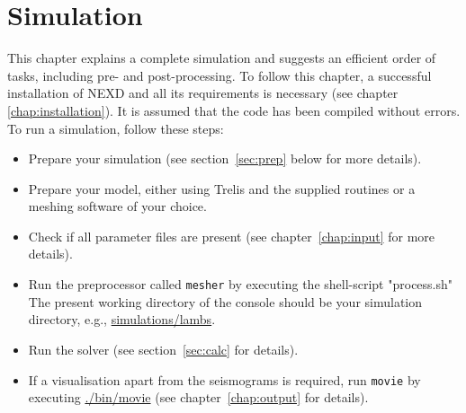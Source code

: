 \chapter{Simulation}
\label{chap:simulation}
	This chapter explains a complete simulation and suggests an efficient order of tasks, including pre- and post-processing. To follow this chapter, a successful installation of NEXD and all its requirements is necessary (see chapter \ref{chap:installation}). It is assumed that the code has been compiled without errors. To run a simulation, follow these steps:
	\begin{itemize}
		\item Prepare your simulation (see section~\ref{sec:prep} below for more details).
    	\item Prepare your model, either using Trelis and the supplied routines or a meshing software of your choice.
    	\item Check if all parameter files are present (see chapter~\ref{chap:input} for more details).
    	\item Run the preprocessor called \texttt{mesher} by executing the shell-script "process.sh" The present working directory of the console should be your simulation directory, e.g., \url{simulations/lambs}.
   		 \item Run the solver (see section~\ref{sec:calc} for details).
    	 \item If a visualisation apart from the seismograms is required, run \texttt{movie} by executing \url{./bin/movie} (see chapter~\ref{chap:output} for details).
	\end{itemize}	 
